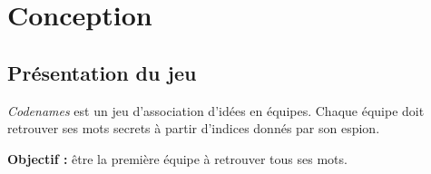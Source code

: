 \documentclass[12pt,a4paper]{article}
\begin{document}
    \newpage
    \section{Conception}
    \label{sec:conception}

        \subsection{Présentation du jeu}

            \textit{Codenames} est un jeu d’association d’idées en équipes.
            Chaque équipe doit retrouver ses mots secrets à partir d’indices donnés par son espion.

            \begin{tcolorbox}[colback=blue!5,colframe=blue!50]
            \textbf{Objectif :} être la première équipe à retrouver tous ses mots.
            \end{tcolorbox}
\end{document}
